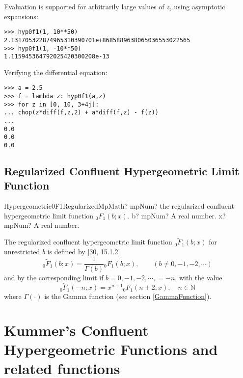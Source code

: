 Evaluation is supported for arbitrarily large values of $z$, using asymptotic expansions:

\begin{lstlisting}
>>> hyp0f1(1, 10**50)
2.131705322874965310390701e+8685889638065036553022565
>>> hyp0f1(1, -10**50)
1.115945364792025420300208e-13
\end{lstlisting}

Verifying the differential equation:

\begin{lstlisting}
>>> a = 2.5
>>> f = lambda z: hyp0f1(a,z)
>>> for z in [0, 10, 3+4j]:
... chop(z*diff(f,z,2) + a*diff(f,z) - f(z))
...
0.0
0.0
0.0
\end{lstlisting}



\subsection{Regularized Confluent Hypergeometric Limit Function}
\label{Hypergeometric0F1RegularizedMpMath}

\begin{mpFunctionsExtract}
	\mpFunctionTwoNotImplemented
	{Hypergeometric0F1RegularizedMpMath? mpNum? the regularized confluent hypergeometric limit function ${}_0F_1(b; x)$.}
	{b? mpNum? A real number.}
	{x? mpNum? A real number.}
\end{mpFunctionsExtract}

\vspace{0.3cm}
The regularized confluent hypergeometric limit function ${}_0\widetilde{F}_1(b;x)$ for unrestricted $b$ is defined by [30, 15.1.2]
\begin{equation}
{}_0\widetilde{F}_1(b;x) = \frac{1}{\Gamma(b)} {}_0F_1(b;x), \quad \quad (b \neq	0, -1, -2, \cdots)  
\end{equation}
and by the corresponding limit if $b = 0, -1, -2, \cdots, = -n$, with the value
\begin{equation}
{}_0\widetilde{F}_1(-n;x) = x^{n+1} {}_0F_1(n+2;x), \quad n \in \mathbb{N}
\end{equation}
where $\Gamma(\cdot)$ is the Gamma function (see section \ref{GammaFunction}).







\newpage
\section{Kummer's Confluent Hypergeometric Functions and related functions}




